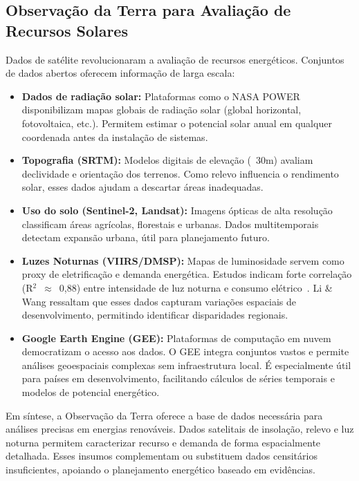 \documentclass[12pt, a4paper]{article}
\begin{document}
\subsection{Observação da Terra para Avaliação de Recursos Solares}

Dados de satélite revolucionaram a avaliação de recursos energéticos. Conjuntos de dados abertos oferecem informação de larga escala:

\begin{itemize}
\item \textbf{Dados de radiação solar:} Plataformas como o NASA POWER disponibilizam mapas globais de radiação solar (global horizontal, fotovoltaica, etc.). Permitem estimar o potencial solar anual em qualquer coordenada antes da instalação de sistemas.
\item \textbf{Topografia (SRTM):} Modelos digitais de elevação (~30m) avaliam declividade e orientação dos terrenos. Como relevo influencia o rendimento solar, esses dados ajudam a descartar áreas inadequadas.
\item \textbf{Uso do solo (Sentinel-2, Landsat):} Imagens ópticas de alta resolução classificam áreas agrícolas, florestais e urbanas. Dados multitemporais detectam expansão urbana, útil para planejamento futuro.
\item \textbf{Luzes Noturnas (VIIRS/DMSP):} Mapas de luminosidade servem como proxy de eletrificação e demanda energética. Estudos indicam forte correlação (R$^2$~$\approx$~0,88) entre intensidade de luz noturna e consumo elétrico~\citep{Li2025}. Li \& Wang ressaltam que esses dados capturam variações espaciais de desenvolvimento, permitindo identificar disparidades regionais.
\item \textbf{Google Earth Engine (GEE):} Plataformas de computação em nuvem democratizam o acesso aos dados. O GEE integra conjuntos vastos e permite análises geoespaciais complexas sem infraestrutura local. É especialmente útil para países em desenvolvimento, facilitando cálculos de séries temporais e modelos de potencial energético.
\end{itemize}

Em síntese, a Observação da Terra oferece a base de dados necessária para análises precisas em energias renováveis. Dados satelitais de insolação, relevo e luz noturna permitem caracterizar recurso e demanda de forma espacialmente detalhada. Esses insumos complementam ou substituem dados censitários insuficientes, apoiando o planejamento energético baseado em evidências.
\end{document}
